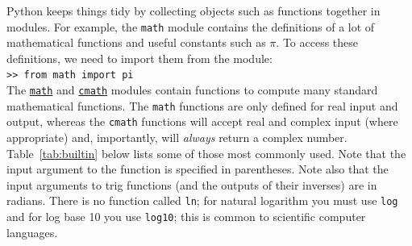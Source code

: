 Python keeps things tidy by collecting objects such as functions
together in modules. For example, the \texttt{math} module contains
the definitions of a lot of mathematical functions and useful
constants such as $\pi$. To access these definitions, we need to import
them from the module: \\

\texttt{>> from math import pi} \\

The \href{https://docs.python.org/3/library/math.html}{\texttt{math}}
and
\href{https://docs.python.org/3/library/cmath.html}{\texttt{cmath}}
modules contain functions to compute many standard mathematical
functions. The \texttt{math} functions are only defined for real input
and output, whereas the \texttt{cmath} functions will accept real and
complex input (where appropriate) and, importantly, will
\textit{always} return a complex number. Table~\ref{tab:builtin} below
lists some of those most commonly used. Note that the input argument
to the function is specified in parentheses. Note also that the input
arguments to trig functions (and the outputs of their inverses) are in
radians.  There is no function called {\tt ln}; for natural logarithm
you must use {\tt log} and for log base 10 you use {\tt log10}; this
is common to scientific computer languages.


